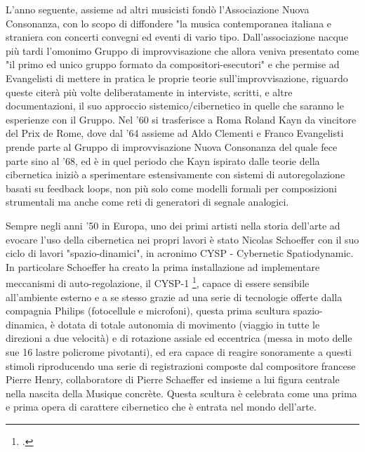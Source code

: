 L'anno seguente, assieme ad altri musicisti
fondò l'Associazione Nuova Consonanza, con lo scopo di diffondere
"la musica contemporanea italiana e straniera con concerti convegni ed eventi di vario tipo.
Dall'associazione nacque più tardi l'omonimo Gruppo di improvvisazione
che allora veniva presentato come "il primo ed unico gruppo formato da compositori-esecutori"
e che permise ad Evangelisti di mettere in pratica le proprie teorie sull'improvvisazione,
riguardo queste citerà più volte deliberatamente in interviste, scritti,
e altre documentazioni, il suo approccio sistemico/cibernetico
in quelle che saranno le esperienze con il Gruppo.
Nel '60 si trasferisce a Roma Roland Kayn da vincitore del Prix de Rome,
dove dal '64 assieme ad Aldo Clementi e Franco Evangelisti
prende parte al Gruppo di improvvisazione Nuova Consonanza
del quale fece parte sino al '68,
ed è in quel periodo che Kayn ispirato dalle teorie della cibernetica iniziò a sperimentare
estensivamente con sistemi di autoregolazione basati su feedback loops,
non più solo come modelli formali per composizioni strumentali
ma anche come reti di generatori di segnale analogici.

Sempre negli anni '50 in Europa, uno dei primi artisti nella storia dell'arte
ad evocare l'uso della cibernetica nei propri lavori è stato
Nicolas Schoeffer con il suo ciclo di lavori "spazio-dinamici", in acronimo
CYSP - Cybernetic Spatiodynamic.
In particolare Schoeffer ha creato la prima installazione ad implementare meccanismi
di auto-regolazione, il CYSP-1 \footcite{sanfilippovallefeedsys},
capace di essere sensibile all'ambiente esterno e a se stesso
grazie ad una serie di tecnologie offerte dalla compagnia Philips (fotocellule e microfoni),
questa prima scultura spazio-dinamica, è dotata di totale autonomia di movimento
(viaggio in tutte le direzioni a due velocità) e di rotazione assiale ed eccentrica
(messa in moto delle sue 16 lastre policrome pivotanti),
ed era capace di reagire sonoramente a questi stimoli riproducendo
una serie di registrazioni composte dal compositore francese Pierre Henry,
collaboratore di Pierre Schaeffer ed insieme a lui figura centrale nella nascita della Musique concrète.
Questa scultura è celebrata come una prima e prima opera di carattere cibernetico
che è entrata nel mondo dell'arte.

